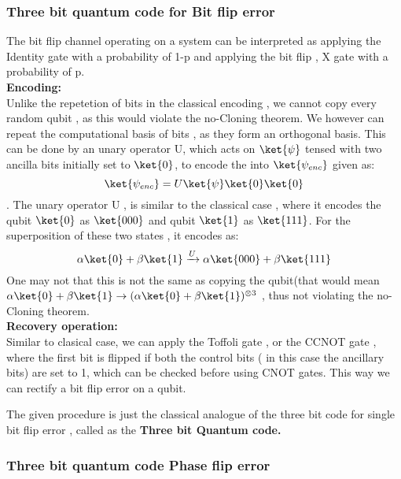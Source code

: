 \subsubsection{Three bit quantum code for Bit flip error}
The bit flip channel operating on a system can be interpreted as applying the Identity gate with a probability of 1-p and applying the bit flip , X gate with a probability of p.
\\
\textbf{Encoding:}\\
Unlike the repetetion of bits in the classical encoding , we cannot copy every random qubit , as this would violate the no-Cloning theorem. We however can repeat the computational basis of bits , as they form an orthogonal basis. This can be done by an unary operator U, which acts on $\ket{\psi}$ tensed with two ancilla bits initially set to $\ket{0}$, to encode the into $\ket{\psi_{enc}}$ given as:
$$\ket{\psi_{enc}} = U\ket{\psi}\ket{0}\ket{0}$$.
The unary operator U , is similar to the classical case , where it encodes the qubit $\ket{0}$ as $\ket{000}$ and qubit $\ket{1}$ as $\ket{111}$. For the superposition of these two states , it encodes as:
$$\alpha\ket{0}+\beta\ket{1} \xrightarrow[]{U} \alpha \ket{000} + \beta\ket{111}$$
One may not that this is not the same as copying the qubit(that would mean $\alpha\ket{0}+\beta\ket{1}\to ({\alpha\ket{0}+\beta\ket{1}})^{\otimes 3}$ , thus not violating the no-Cloning theorem.\\ \newline
\textbf{Recovery operation:}\\
Similar to clasical case, we can apply the Toffoli gate , or the CCNOT gate , where the first bit is flipped if both the control bits ( in this case the ancillary bits) are set to 1, which can be checked before using CNOT gates. This way we can rectify a bit flip error on a qubit. \\ \par
The given procedure is just the classical analogue of the three bit code for single bit flip error , called as the \textbf{Three bit Quantum code.}
\subsubsection{Three bit quantum code Phase flip error}

